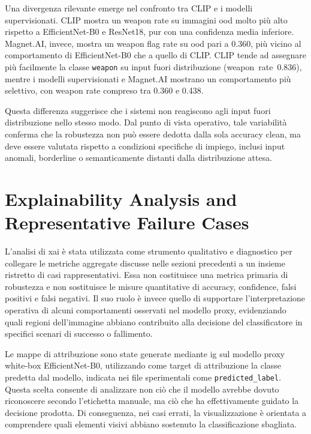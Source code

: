 Una divergenza rilevante emerge nel confronto tra CLIP e i modelli
supervisionati. CLIP mostra un weapon rate su immagini \gls{ood} molto più alto
rispetto a EfficientNet-B0 e ResNet18, pur con una confidenza media inferiore.
Magnet.AI, invece, mostra un weapon flag rate su \gls{ood} pari a 0.360, più
vicino al comportamento di EfficientNet-B0 che a quello di CLIP. CLIP tende ad
assegnare più facilmente la classe \texttt{weapon} su input fuori distribuzione
\mbox{(weapon rate 0.836)}, mentre i modelli supervisionati e Magnet.AI mostrano
un comportamento più selettivo, con weapon rate compreso tra 0.360 e 0.438.

Questa differenza suggerisce che i sistemi non reagiscono agli input fuori
distribuzione nello stesso modo. Dal punto di vista operativo, tale variabilità
conferma che la robustezza non può essere dedotta dalla sola accuracy clean, ma
deve essere valutata rispetto a condizioni specifiche di impiego, inclusi input
anomali, borderline o semanticamente distanti dalla distribuzione attesa.



\section{Explainability Analysis and Representative Failure Cases}
\label{sec:results-xai}

L'analisi di \gls{xai} è stata utilizzata come strumento qualitativo e
diagnostico per collegare le metriche aggregate discusse nelle sezioni
precedenti a un insieme ristretto di casi rappresentativi. Essa non costituisce
una metrica primaria di robustezza e non sostituisce le misure quantitative di
accuracy, confidence, falsi positivi e falsi negativi. Il suo ruolo è invece
quello di supportare l'interpretazione operativa di alcuni comportamenti
osservati nel modello proxy, evidenziando quali regioni dell'immagine abbiano
contribuito alla decisione del classificatore in specifici scenari di successo
o fallimento.

Le mappe di attribuzione sono state generate mediante \gls{ig} sul modello
proxy white-box EfficientNet-B0, utilizzando come target di attribuzione la
classe predetta dal modello, indicata nei file sperimentali come
\texttt{predicted\_label}. Questa scelta consente di analizzare non ciò che il
modello avrebbe dovuto riconoscere secondo l'etichetta manuale, ma ciò che ha
effettivamente guidato la decisione prodotta. Di conseguenza, nei casi errati,
la visualizzazione è orientata a comprendere quali elementi visivi abbiano
sostenuto la classificazione sbagliata.

